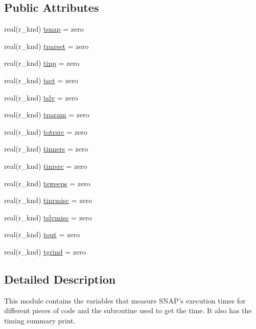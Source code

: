 \subsection*{Public Attributes}
\begin{DoxyCompactItemize}
\item 
real(r\-\_\-knd) \hyperlink{classtime__module_aa8ee658575005edd9d28a62a468cfde2}{tsnap} = zero
\item 
real(r\-\_\-knd) \hyperlink{classtime__module_a5265ce5bfd23e9a9a77547577f88473d}{tparset} = zero
\item 
real(r\-\_\-knd) \hyperlink{classtime__module_a4d112ccfe86d8ab7b0a2c04b98078db3}{tinp} = zero
\item 
real(r\-\_\-knd) \hyperlink{classtime__module_a81f8cc404349dd114670913d2d11f055}{tset} = zero
\item 
real(r\-\_\-knd) \hyperlink{classtime__module_a1f3f475f37c8ce006cdd2de5693552d9}{tslv} = zero
\item 
real(r\-\_\-knd) \hyperlink{classtime__module_ab78f7d01ea1bde455310853bc2be1594}{tparam} = zero
\item 
real(r\-\_\-knd) \hyperlink{classtime__module_a309311ea73088ac5662d6acaf1aca614}{totrsrc} = zero
\item 
real(r\-\_\-knd) \hyperlink{classtime__module_a034b038776e4e01f89f2eee00a20f968}{tinners} = zero
\item 
real(r\-\_\-knd) \hyperlink{classtime__module_a384b45af0c322ff75699b051ec3a96ec}{tinrsrc} = zero
\item 
real(r\-\_\-knd) \hyperlink{classtime__module_aac45a44eaf19a7bea1d8f553c3a552be}{tsweeps} = zero
\item 
real(r\-\_\-knd) \hyperlink{classtime__module_a548875e460521a98bdde436c107d5da0}{tinrmisc} = zero
\item 
real(r\-\_\-knd) \hyperlink{classtime__module_ae8ff3e794ae2fcb536002fc5ba9e6c72}{tslvmisc} = zero
\item 
real(r\-\_\-knd) \hyperlink{classtime__module_a67fe4201db76455b13a6140ddeb5c57d}{tout} = zero
\item 
real(r\-\_\-knd) \hyperlink{classtime__module_a83421671217058a30dcccb2ea5b80cc6}{tgrind} = zero
\end{DoxyCompactItemize}


\subsection{Detailed Description}
This module contains the variables that measure S\-N\-A\-P's execution times for different pieces of code and the subroutine used to get the time. It also has the timing summary print. 


